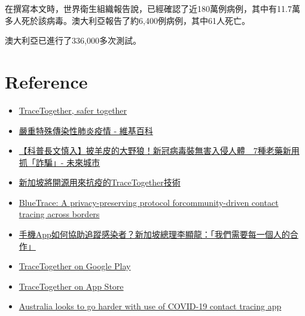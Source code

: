 \documentclass[12pt, a4paper]{report}
\begin{document}
在撰寫本文時，世界衛生組織報告說，已經確認了近180萬例病例，其中有11.7萬多人死於該病毒。澳大利亞報告了約6,400例病例，其中61人死亡。

澳大利亞已進行了336,000多次測試。



\part{Reference}

\begin{itemize}
    \item \href{https://www.tracetogether.gov.sg/}{TraceTogether, safer together}
    \item \href{https://zh.wikipedia.org/wiki/2019%E5%86%A0%E7%8A%B6%E7%97%85%E6%AF%92%E7%97%85%E7%96%AB%E6%83%85}{嚴重特殊傳染性肺炎疫情 - 維基百科}
    \item \href{https://futurecity.cw.com.tw/article/1336}{【科普長文慎入】披羊皮的大野狼！新冠病毒裝無害入侵人體　7種老藥新用抓「詐騙」- 未來城市}
    \item \href{https://www.ithome.com.tw/news/136577}{新加坡將開源用來抗疫的TraceTogether技術}
    \item \href{https://bluetrace.io/static/bluetrace_whitepaper-938063656596c104632def383eb33b3c.pdf}{BlueTrace: A privacy-preserving protocol forcommunity-driven contact tracing across borders}
    \item \href{https://www.thenewslens.com/article/134198}{手機App如何協助追蹤感染者？新加坡總理李顯龍：「我們需要每一個人的合作」}
    \item \href{https://play.google.com/store/apps/details?id=sg.gov.tech.bluetrace&hl=en_US}{TraceTogether on Google Play}
    \item \href{https://apps.apple.com/sg/app/tracetogether/id1498276074}{TraceTogether on App Store}
    \item \href{https://www.zdnet.com/article/australia-looks-to-go-harder-with-use-of-covid-19-contact-tracing-app/}{Australia looks to go harder with use of COVID-19 contact tracing app}
\end{itemize}
\end{document}
